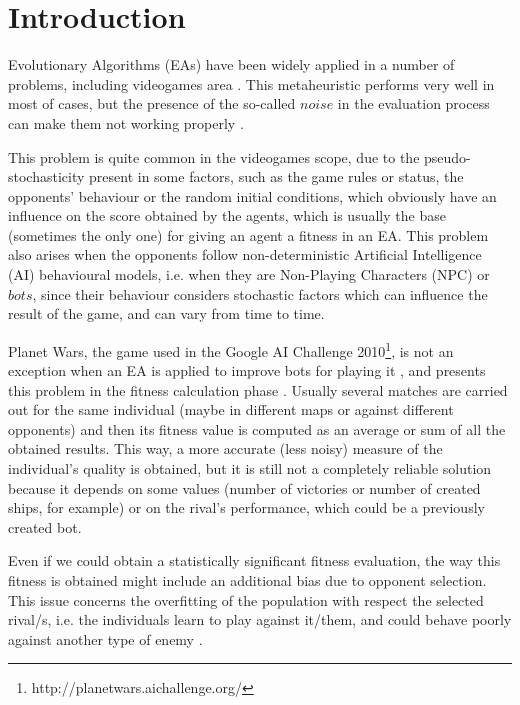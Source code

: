 \documentclass[conference]{IEEEtran}
\begin{document}
\section{Introduction}
\label{sec:intro}
%
Evolutionary Algorithms (EAs)\cite{EAs_Back96} have been widely applied in a number of problems, including videogames area \cite{Ponsen_EvLearn_RTS,co-evol-rts2006,Su-EAs_StrategySel09,cooperativebots_CIG2010,Cook_Platforming2012}. This metaheuristic performs very well in most of cases, but the presence
 of the so-called $noise$ in the evaluation process can make them not
 working properly \cite{Genebot_JCST}.

This problem is quite common in the videogames scope, due to the
pseudo-stochasticity present in some factors, such as the game rules
or status, the opponents' behaviour or the random initial conditions,
which obviously have an influence on the score obtained by the agents,
which is usually the base (sometimes the only one) for giving an agent  a
fitness in an EA.
This problem also arises when the opponents follow non-deterministic
Artificial Intelligence (AI) behavioural models, i.e. when they are
Non-Playing Characters (NPC) or $bots$, since their behaviour
considers stochastic factors which can influence the result of the
game, and can vary from time to time. %

Planet Wars, the game used in the Google AI Challenge
2010\footnote{http://planetwars.aichallenge.org/}, is not an exception
when an EA is applied to improve bots for playing it
\cite{Genebot-IWANN2011,Genebot_CEC11,Genebot_CIG2012},  and presents
this problem in the fitness calculation phase \cite{Genebot_JCST}. Usually several matches are carried out for the same
individual (maybe in different maps or against different opponents)
and then its fitness value is computed as an average or sum of all the obtained results. This way, a more accurate (less noisy) measure of the individual's quality is obtained, but it is still not a completely reliable solution because it depends on some values (number of victories or number of created ships, for example) or on the rival's performance, which could be a previously created bot.


Even if we could obtain a statistically significant fitness
evaluation, the way this fitness is obtained might include an additional
bias due to opponent selection. This issue concerns the overfitting
of the population with respect the selected rival/s, i.e. the
individuals learn to play against it/them, and could behave poorly
against another type of enemy \cite{Genebot_JCST,wilcoxon:ga}.
\end{document}
